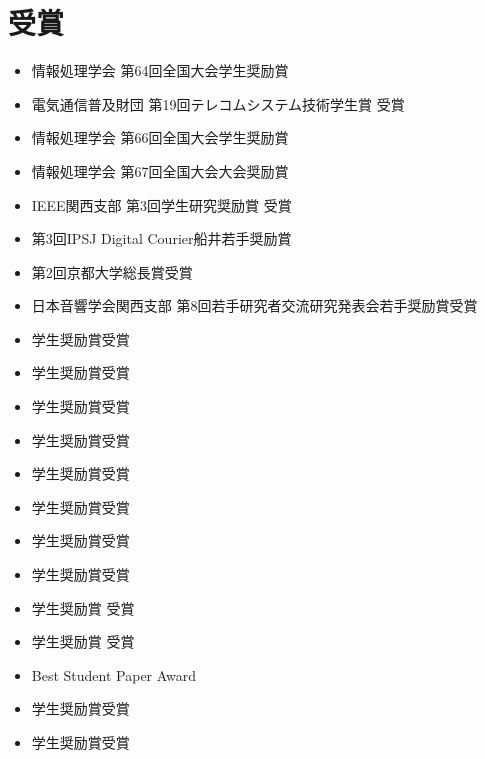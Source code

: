 \section*{受賞}
\begin{itemize}
  
  \item 
  情報処理学会 第64回全国大会学生奨励賞
  \item 
  電気通信普及財団 第19回テレコムシステム技術学生賞 受賞
  \item 
  情報処理学会 第66回全国大会学生奨励賞
  \item 
  情報処理学会 第67回全国大会大会奨励賞
  \item 
  IEEE関西支部 第3回学生研究奨励賞 受賞
  \item 
  第3回IPSJ Digital Courier船井若手奨励賞
  \item 
  第2回京都大学総長賞受賞
  \item 
  日本音響学会関西支部 第8回若手研究者交流研究発表会若手奨励賞受賞
  \item 
  学生奨励賞受賞
  \item 
  学生奨励賞受賞
  \item 
  学生奨励賞受賞
  \item 
  学生奨励賞受賞
  \item 
  学生奨励賞受賞
  \item 
  学生奨励賞受賞
  \item 
  学生奨励賞受賞
  \item 
  学生奨励賞受賞
  \item 
  学生奨励賞 受賞
  \item 
  学生奨励賞 受賞
  \item 
  Best Student Paper Award
  \item 
  学生奨励賞受賞
  \item 
  学生奨励賞受賞
\end{itemize}

